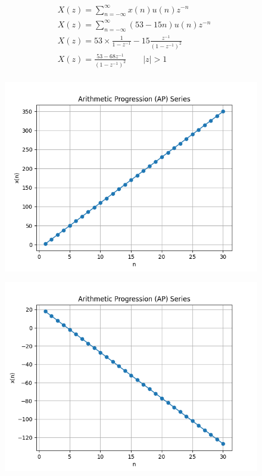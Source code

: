 \documentclass[journal,12pt,twocolumn]{IEEEtran}
\theoremstyle{remark}
\begin{document}
\begin{enumerate}
\begin{align}
       &X(z) = \sum_{n=-\infty}^{\infty} x(n) u(n)z^{-n} \\
       &X(z) = \sum_{n=-\infty}^{\infty} (53 - 15n) u(n)z^{-n} \\
       &X(z)=53 \times \frac{1}{1-{z^{-1}}}- 15\frac{z^{-1}}{(1-{z^{-1}})^2}\\
       &X(z)=\frac{53-68{z^{-1}}}{(1-{z^{-1}})^2}\qquad|z|>1\\
\end{align}
\end{enumerate}

\begin{figure}[h]
       \vspace*{-1cm}
       \centering
        \includegraphics[width=0.8\linewidth]{figures/download.png} %
        \caption{}
   \label{fig:your_label}
\end{figure}

\begin{figure}[h]
      \vspace*{-1cm}
      \centering
       \includegraphics[width=0.8\linewidth]{figures/download2.png} %
        \caption{}
    \end{figure}
    
\end{document}
